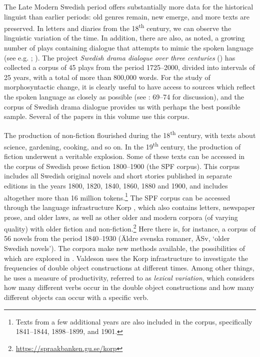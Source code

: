 \documentclass[output=paper]{langscibook}
\begin{document}
The Late Modern Swedish period offers substantially more data for the historical linguist than earlier periods: old genres remain, new emerge, and more texts are preserved. In letters and diaries from the 18\textsuperscript{th} century, we can observe the linguistic variation of the time. In addition, there are also, as noted, a growing number of plays containing dialogue that attempts to mimic the spoken language (see e.g. \citealt{Widmark1970,Widmark2000, Widmark1970}; \citealt{Thelander2007}). The project \textit{Swedish drama dialogue over three centuries} (\citealt{MarttalaStromquist2001}) has collected a corpus of 45 plays from the period 1725–2000, divided into intervals of 25 years, with a total of more than 800,000 words. For the study of morphosyntactic change, it is clearly useful to have access to sources which reflect the spoken language as closely as possible (see \citealt{Magnusson2007}: 69–74 for discussion), and the corpus of Swedish drama dialogue provides us with perhaps the best possible sample. Several of the papers in this volume use this corpus.



The production of non-fiction flourished during the 18\textsuperscript{th} century, with texts about science, gardening, cooking, and so on. In the 19\textsuperscript{th} century, the production of fiction underwent a veritable explosion. Some of these texts can be accessed in the corpus of Swedish prose fiction 1800–1900 (the SPF corpus). This corpus includes all Swedish original novels and short stories published in separate editions in the years 1800, 1820, 1840, 1860, 1880 and 1900, and includes altogether more than 16 million tokens.\footnote{Texts from a few additional years are also included in the corpus, specifically 1841–1844, 1898–1899, and 1901.}  The SPF corpus can be accessed through the language infrastructure Korp \citep{BorinEtAl2012}, which also contains letters, newspaper prose, and older laws, as well as other older and modern corpora (of varying quality) with older fiction and non-fiction.\footnote{\url{https://spraakbanken.gu.se/korp}}  Here there is, for instance, a corpus of 56 novels from the period 1840–1930 (Äldre svenska romaner, ÄSv, ‘older Swedish novels’). The corpora make new methods available, the possibilities of which are explored in . Valdeson uses the Korp infrastructure to investigate the frequencies of double object constructions at different times. Among other things, he uses a measure of productivity, referred to as \textit{lexical variation}, which considers how many different verbs occur in the double object constructions and how many different objects can occur with a specific verb.
\end{document}
